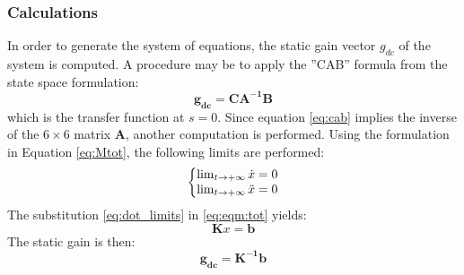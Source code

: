 \documentclass[twosided,a4paper]{article}           %
\makeatletter
\newenvironment{sistema}%
{\left\lbrace\begin{array}{@{}l@{}}}%
	{\end{array}\right.}
\makeatother
\begin{document}
\subsubsection{Calculations}
In order to generate the system of equations, the static gain vector $g_{dc}$ of the system is computed. A procedure may be to apply the ''CAB'' formula from the state space formulation:
\begin{equation}
\label{eq:cab}
	\bm{g_{dc}} =	\bm{CA^{-1}B}
\end{equation}
which is the transfer function at $s = 0$. Since equation \eqref{eq:cab} implies the inverse of the $6 \times 6$ matrix $\bm A$, another computation is performed. Using the formulation in Equation \eqref{eq:Mtot}, the following limits are performed:
\begin{equation}
	\begin{sistema}
	\lim_{t \to + \infty}{\dot{x}}  = 0  \\
	\lim_{t \to + \infty}{\ddot{x}} = 0
	\end{sistema}
	\label{eq:dot_limits}
\end{equation}
The substitution \eqref{eq:dot_limits} in \eqref{eq:eqm:tot} yields:
\begin{equation}
\bm K x = \bm b
\label{eq:dot0}
\end{equation} The static gain is then:
\begin{equation}
	\bm{g_{dc}} = \bm{K^{-1}}\bm{b}
\end{equation}
\end{document}
